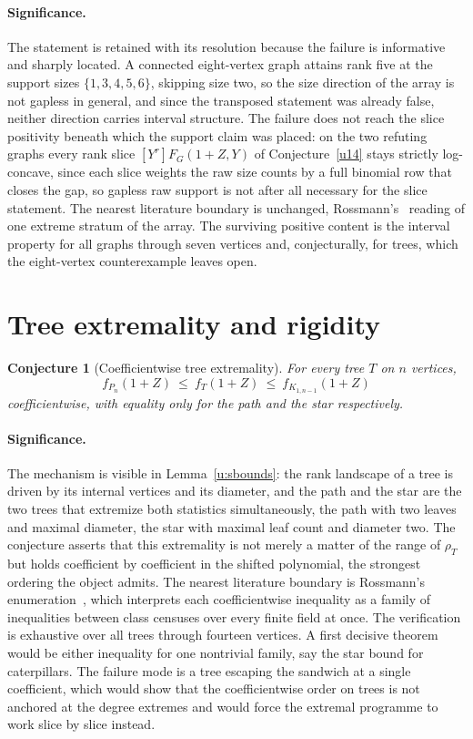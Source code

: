 \documentclass[11pt]{article}
\newtheorem{conjecture}{Conjecture}
\theoremstyle{definition}
\begin{document}
\paragraph{Significance.}
The statement is retained with its resolution because the failure is informative and sharply located.  A connected eight-vertex graph attains rank five at the support sizes $\{1,3,4,5,6\}$, skipping size two, so the size direction of the array is not gapless in general, and since the transposed statement was already false, neither direction carries interval structure.  The failure does not reach the slice positivity beneath which the support claim was placed: on the two refuting graphs every rank slice $[Y^r]F_G(1+Z,Y)$ of Conjecture~\ref{u14} stays strictly log-concave, since each slice weights the raw size counts by a full binomial row that closes the gap, so gapless raw support is not after all necessary for the slice statement.  The nearest literature boundary is unchanged, Rossmann's~\cite{Ros22} reading of one extreme stratum of the array.  The surviving positive content is the interval property for all graphs through seven vertices and, conjecturally, for trees, which the eight-vertex counterexample leaves open.

\section{Tree extremality and rigidity}

\begin{conjecture}[Coefficientwise tree extremality]\label{u16}
For every tree $T$ on $n$ vertices,
\[
f_{P_n}(1+Z)\ \le\ f_T(1+Z)\ \le\ f_{K_{1,n-1}}(1+Z)
\]
coefficientwise, with equality only for the path and the star respectively.
\end{conjecture}

\paragraph{Significance.}
The mechanism is visible in Lemma~\ref{u:sbounds}: the rank landscape of a tree is driven by its internal vertices and its diameter, and the path and the star are the two trees that extremize both statistics simultaneously, the path with two leaves and maximal diameter, the star with maximal leaf count and diameter two.  The conjecture asserts that this extremality is not merely a matter of the range of $\rho_T$ but holds coefficient by coefficient in the shifted polynomial, the strongest ordering the object admits.  The nearest literature boundary is Rossmann's enumeration~\cite{Ros22}, which interprets each coefficientwise inequality as a family of inequalities between class censuses over every finite field at once.  The verification is exhaustive over all trees through fourteen vertices.  A first decisive theorem would be either inequality for one nontrivial family, say the star bound for caterpillars.  The failure mode is a tree escaping the sandwich at a single coefficient, which would show that the coefficientwise order on trees is not anchored at the degree extremes and would force the extremal programme to work slice by slice instead.
\end{document}

